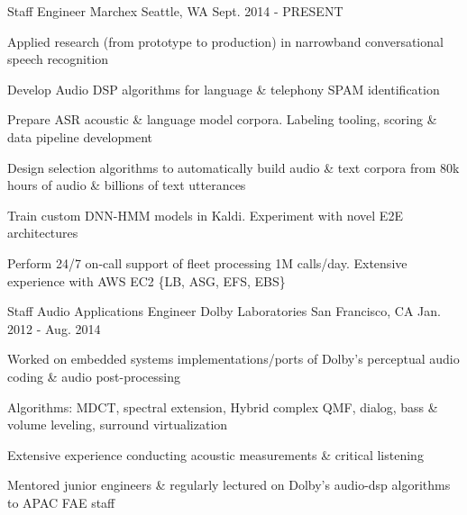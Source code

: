 

\begin{cventries}

  \cventry
    {Staff Engineer} %
    {Marchex} %
    {Seattle, WA} %
    {Sept. 2014 - PRESENT} %
    {
      \begin{cvitems} %
        \item {Applied research (from prototype to production) in narrowband conversational speech recognition}
        \item {Develop Audio DSP algorithms for language \& telephony SPAM identification}
        \item {Prepare ASR acoustic \& language model corpora. Labeling tooling, scoring \& data pipeline development}
        \item {Design selection algorithms to automatically build audio \& text corpora from 80k hours of audio \& billions of text utterances}
        \item {Train custom DNN-HMM models in Kaldi. Experiment with novel E2E architectures}
        \item {Perform 24/7 on-call support of fleet processing 1M calls/day. Extensive experience with AWS EC2 \{LB, ASG, EFS, EBS\}}
      \end{cvitems}
    }

  \cventry
    {Staff Audio Applications Engineer} %
    {Dolby Laboratories} %
    {San Francisco, CA} %
    {Jan. 2012 - Aug. 2014} %
    {
      \begin{cvitems} %
        \item {Worked on embedded systems implementations/ports of Dolby's perceptual audio coding \& audio post-processing}
        \item {Algorithms: MDCT, spectral extension, Hybrid complex QMF, dialog, bass \& volume leveling, surround virtualization}
		\item {Extensive experience conducting acoustic measurements \& critical listening}
        \item {Mentored junior engineers \& regularly lectured on Dolby's audio-dsp algorithms to APAC FAE staff}
      \end{cvitems}
    }


\end{cventries}
